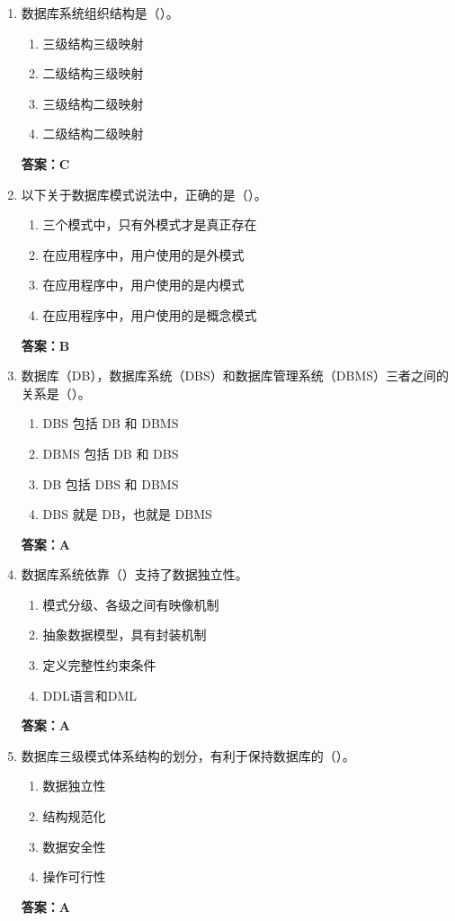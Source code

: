 \documentclass[12pt, a4paper]{article}
\begin{document}
\begin{enumerate}[label=\arabic*.]
	\item 数据库系统组织结构是（\quad）。
	      \begin{enumerate}
		      \item 三级结构三级映射
		      \item 二级结构三级映射
		      \item 三级结构二级映射
		      \item 二级结构二级映射
	      \end{enumerate}
	      \textbf{答案：C}

	\item 以下关于数据库模式说法中，正确的是（\quad）。
	      \begin{enumerate}
		      \item 三个模式中，只有外模式才是真正存在
		      \item 在应用程序中，用户使用的是外模式
		      \item 在应用程序中，用户使用的是内模式
		      \item 在应用程序中，用户使用的是概念模式
	      \end{enumerate}
	      \textbf{答案：B}

	\item 数据库（DB），数据库系统（DBS）和数据库管理系统（DBMS）三者之间的关系是（\quad）。
	      \begin{enumerate}
		      \item DBS 包括 DB 和 DBMS
		      \item DBMS 包括 DB 和 DBS
		      \item DB 包括 DBS 和 DBMS
		      \item DBS 就是 DB，也就是 DBMS
	      \end{enumerate}
	      \textbf{答案：A}

	\item 数据库系统依靠（\quad）支持了数据独立性。
	      \begin{enumerate}
		      \item 模式分级、各级之间有映像机制
		      \item 抽象数据模型，具有封装机制
		      \item 定义完整性约束条件
		      \item DDL语言和DML
	      \end{enumerate}
	      \textbf{答案：A}

	\item 数据库三级模式体系结构的划分，有利于保持数据库的（\quad）。
	      \begin{enumerate}
		      \item 数据独立性
		      \item 结构规范化
		      \item 数据安全性
		      \item 操作可行性
	      \end{enumerate}
	      \textbf{答案：A}


\end{enumerate}
\end{document}
